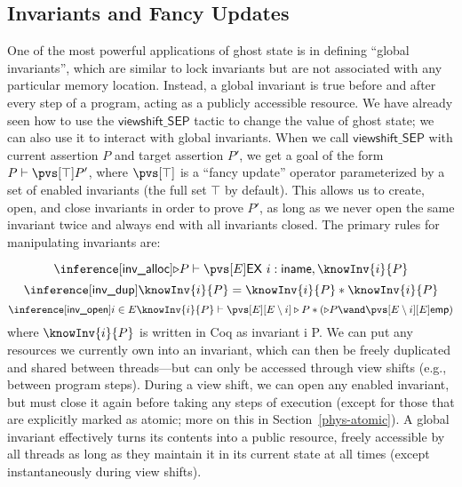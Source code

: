 \documentclass[11pt]{article}
\begin{document}
\subsection{Invariants and Fancy Updates}
\label{inv}
One of the most powerful applications of ghost state is in defining ``global invariants'', which are similar to lock invariants but are not associated with any particular memory location. Instead, a global invariant is true before and after every step of a program, acting as a publicly accessible resource. We have already seen how to use the $\mathsf{viewshift\_SEP}$ tactic to change the value of ghost state; we can also use it to interact with global invariants. When we call $\mathsf{viewshift\_SEP}$ with current assertion $P$ and target assertion $P'$, we get a goal of the form $P \vdash \pvs[\top] P'$, where $\pvs[\top]$ is a ``fancy update'' operator parameterized by a set of enabled invariants (the full set $\top$ by default). This allows us to create, open, and close invariants in order to prove $P'$, as long as we never open the same invariant twice and always end with all invariants closed. The primary rules for manipulating invariants are:

$$\inference[\textsf{inv\_alloc}]{}{\triangleright P \vdash \pvs[E] \mathsf{EX}\ i : \mathsf{iname}, \knowInv{i}{P}}$$
$$\inference[\textsf{inv\_dup}]{}{\knowInv{i}{P} = \knowInv{i}{P} * \knowInv{i}{P}}$$
$$\inference[\textsf{inv\_open}]{i \in E}{\knowInv{i}{P} \vdash \pvs[E][E \setminus i] \triangleright P * (\triangleright P \wand \pvs[E \setminus i][E] \mathsf{emp})}$$
where $\knowInv{i}{P}$ is written in Coq as \textsf{invariant i P}. We can put any resources we currently own into an invariant, which can then be freely duplicated and shared between threads---but can only be accessed through view shifts (e.g., between program steps). During a view shift, we can open any enabled invariant, but must close it again before taking any steps of execution (except for those that are explicitly marked as atomic; more on this in Section~\ref{phys-atomic}). A global invariant effectively turns its contents into a public resource, freely accessible by all threads as long as they maintain it in its current state at all times (except instantaneously during view shifts).
\end{document}
